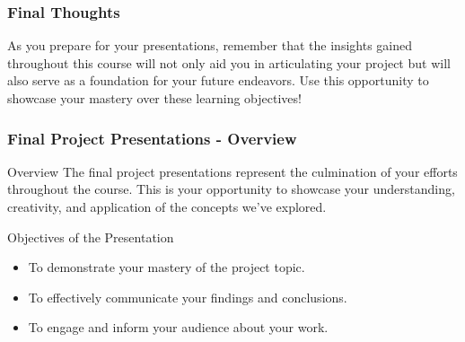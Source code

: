 \documentclass[aspectratio=169]{beamer}
\begin{document}
\begin{frame}[fragile]
    \frametitle{Final Thoughts}
    As you prepare for your presentations, remember that the insights gained throughout this course will not only aid you in articulating your project but will also serve as a foundation for your future endeavors. Use this opportunity to showcase your mastery over these learning objectives!
\end{frame}

\begin{frame}[fragile]
    \frametitle{Final Project Presentations - Overview}
    \begin{block}{Overview}
        The final project presentations represent the culmination of your efforts throughout the course. 
        This is your opportunity to showcase your understanding, creativity, and application of the concepts we've explored.
    \end{block}
    
    \begin{block}{Objectives of the Presentation}
        \begin{itemize}
            \item To demonstrate your mastery of the project topic.
            \item To effectively communicate your findings and conclusions.
            \item To engage and inform your audience about your work.
        \end{itemize}
    \end{block}
\end{frame}
\end{document}
